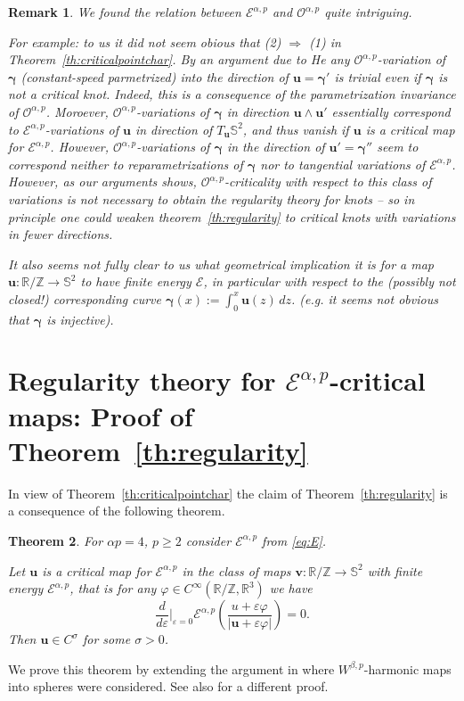 \documentclass[a4paper,10pt,intlimits,ngerman]{amsart}
\newtheorem{theorem}{Theorem}[section]
\newtheorem{remark}[theorem]{Remark}
\numberwithin{equation}{section}
\newcommand{\R}{\mathbb{R}}
\newcommand{\Z}{\mathbb{Z}}
\renewcommand{\S}{\mathbb{S}}
\newcommand{\solv}{{\boldsymbol{v}}}
\newcommand{\sol}{{\boldsymbol{\gamma}}}
\newcommand{\solu}{{\boldsymbol{u}}}
\newcommand{\brac}[1]{\left ( #1 \right )}
\newcommand{\eps}{\varepsilon}
\begin{document}
\begin{remark}
We found the relation between $\mathcal{E}^{\alpha,p}$ and $\mathcal{O}^{\alpha,p}$ quite intriguing. 

For example: to us it did not seem obious that (2) $\Rightarrow$ (1) in Theorem~\ref{th:criticalpointchar}. By an argument due to He \cite{He2000} any $\mathcal{O}^{\alpha,p}$-variation of $\sol$ (constant-speed parmetrized) into the direction of $\solu=\sol'$ is trivial even if $\sol$ is not a critical knot. Indeed, this is a consequence of the parametrization invariance of $\mathcal{O}^{\alpha,p}$. 
Moroever, $\mathcal{O}^{\alpha,p}$-variations of $\sol$ in direction $\solu \wedge \solu'$ essentially correspond to $\mathcal{E}^{\alpha,p}$-variations of $\solu$ in direction of $T_\solu \S^2$, and thus vanish if $\solu$ is a critical map for $\mathcal{E}^{\alpha,p}$.
However, $\mathcal{O}^{\alpha,p}$-variations of $\sol$ in the direction of $\solu' = \sol''$ seem to correspond neither to reparametrizations of $\sol$ nor to tangential variations of $\mathcal{E}^{\alpha,p}$. However, as our arguments shows, $\mathcal{O}^{\alpha,p}$-criticality with respect to this class of variations is not necessary to obtain the regularity theory for knots -- so in principle one could weaken theorem~\ref{th:regularity} to critical knots with variations in fewer directions.

It also seems not fully clear to us what geometrical implication it is for a map $\solu: \R /\Z \to \S^2$ to have finite energy $\mathcal{E}$, in particular with respect to the (possibly not closed!) corresponding curve $\sol(x) := \int_0^x \solu(z)\, dz$. (e.g. it seems not obvious that $\sol$ is injective).
\end{remark}


\section{Regularity theory for \texorpdfstring{$\mathcal{E}^{\alpha,p}$}{E}-critical maps: Proof of Theorem~\ref{th:regularity}}
In view of Theorem~\ref{th:criticalpointchar} the claim of Theorem~\ref{th:regularity} is a consequence of the following theorem.
\begin{theorem}\label{th:eregularity}
For $\alpha p = 4$, $p \geq 2$ consider $\mathcal{E}^{\alpha,p}$ from \eqref{eq:E}.

Let $\solu$ is a critical map for $\mathcal{E}^{\alpha,p}$ in the class of maps $\solv: \R/\Z \to \S^2$ with finite energy $\mathcal{E}^{\alpha,p}$, that is for any $\varphi \in C^\infty(\R/\Z,\R^3)$ we have
 \[
  \frac{d}{d\eps} \Big |_{\eps = 0} \mathcal{E}^{\alpha,p}\brac{\frac{u+\eps \varphi}{|\solu+\eps \varphi|}} = 0.
 \]
Then $\solu \in C^{\sigma}$ for some $\sigma > 0$.
\end{theorem}
We prove this theorem by extending the argument in \cite{SchikorraCPDE14} where $W^{\beta,p}$-harmonic maps into spheres were considered. See also \cite{MS18} for a different proof. 
\end{document}
